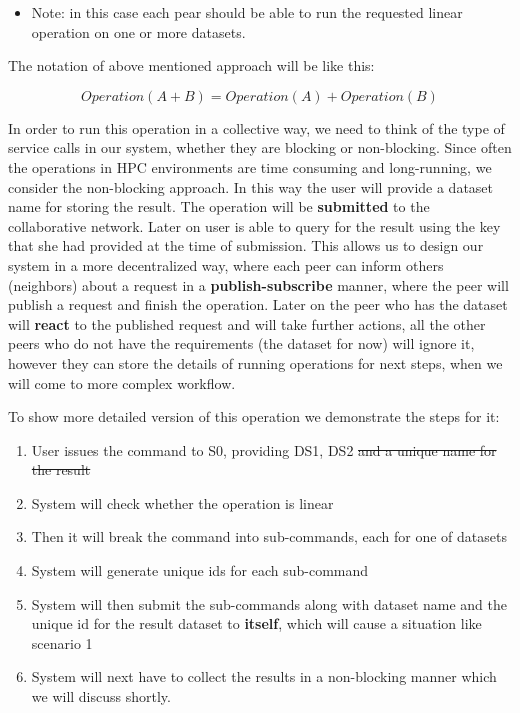 \begin{itemize}
\item Note: in this case each pear should be able to run the requested linear operation on one or more datasets.
\end{itemize}

The notation of above mentioned approach will be like this:

\[ Operation(A + B) = Operation(A) + Operation(B) \]

In order to run this operation in a collective way, we need to think of the type of service calls in our system, whether they are blocking or
non-blocking. Since often the operations in HPC environments are time consuming and long-running, we consider the non-blocking approach. In
this way the user will provide a dataset name for storing the result. The operation will be \textbf{submitted} to the collaborative network.
Later on user is able to query for the result using the key that she had provided at the time of submission. This allows us to design our system
in a more decentralized way, where each peer can inform others (neighbors) about a request in a \textbf{publish-subscribe} manner, where the peer
will publish a request and finish the operation. Later on the peer who has the dataset will \textbf{react} to the published request and will take
further actions, all the other peers who do not have the requirements (the dataset for now) will ignore it, however they can store the details of 
running operations for next steps, when we will come to more complex workflow.

To show more detailed version of this operation we demonstrate the steps for it:

\begin{enumerate}
\item User issues the command to S0, providing DS1, DS2 \st{and a unique name for the result}
\item System will check whether the operation is linear
\item Then it will break the command into sub-commands, each for one of datasets
\item System will generate unique ids for each sub-command
\item System will then submit the sub-commands along with dataset name and the unique id for the result dataset
to \textbf{itself}, which will cause a situation like scenario 1
\item System will next have to collect the results in a non-blocking manner which we will discuss shortly.
\end{enumerate}

